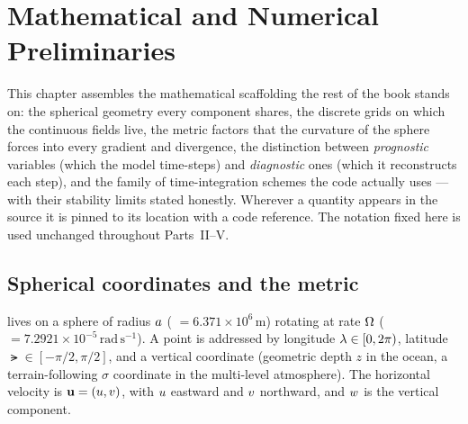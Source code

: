 \chapter{Mathematical and Numerical Preliminaries}\label{chap:ch02_preliminaries}

\providecommand{\Cou}{C}        %
\providecommand{\nlat}{N_\lat}  %
\providecommand{\nlon}{N_\lon}  %

This chapter assembles the mathematical scaffolding the rest of the book stands on: the
spherical geometry every component shares, the discrete grids on which the continuous fields
live, the metric factors that the curvature of the sphere forces into every gradient and
divergence, the distinction between \emph{prognostic} variables (which the model time-steps) and
\emph{diagnostic} ones (which it reconstructs each step), and the family of time-integration
schemes the code actually uses --- with their stability limits stated honestly. Wherever a
quantity appears in the source it is pinned to its location with a code reference. The notation
fixed here is used unchanged throughout Parts~II--V.

\section{Spherical coordinates and the metric}

\model{} lives on a sphere of radius $a$ ( $=6.371\times10^{6}\,\mathrm{m}$)
rotating at rate $\Omega$ ( $=7.2921\times10^{-5}\,\mathrm{rad\,s^{-1}}$). A point is
addressed by longitude $\lambda\in[0,2\pi)$, latitude $\lat\in[-\pi/2,\pi/2]$, and a vertical
coordinate (geometric depth $z$ in the ocean, a terrain-following $\sigma$ coordinate in the
multi-level atmosphere). The horizontal velocity is $\mathbf{u}=(u,v)$, with $u$ eastward and
$v$ northward, and $w$ is the vertical component.


